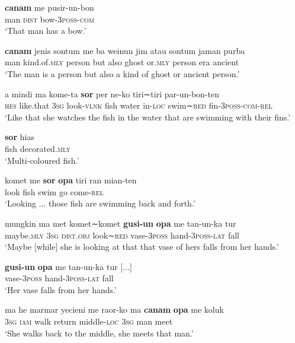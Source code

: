 \documentclass[output=paper,colorlinks,citecolor=brown]{langscibook}
\begin{document}
\ex\label{exe:fishnarr:m} \gll \textbf{canam} me pusir-un-bon\\
man \textsc{dist} bow-\textsc{3poss-com}\\
\glt`That man has a bow.'

\ex\label{exe:fishnarr:n} \gll \textbf{canam} jenis sontum me ba weinun jim atau sontum jaman purba\\
man kind.of.\textsc{mly} person {\glme} but also ghost or.\textsc{mly} person era ancient\\
\glt `The man is a person but also a kind of ghost or ancient person.'

\ex\label{exe:fishnarr:o}	\gll a mindi ma kome-ta \textbf{sor} per ne-ko tiri∼tiri par-un-bon-ten\\
\textsc{hes} like.that \textsc{3sg} look-\textsc{vlnk} fish water in-\textsc{loc} swim∼\textsc{red} fin-\textsc{3poss-com-rel}\\
\glt `Like that she watches the fish in the water that are swimming with their fins.'

\ex\label{exe:fishnarr:p} \gll \textbf{sor} hias\\
fish decorated.\textsc{mly}\\
\glt `Multi-coloured fish.'

\ex\label{exe:fishnarr:q} \gll komet me \textbf{sor} \textbf{opa} tiri ran mian-ten\\
look {\glme} fish {\glopa} swim go come-\textsc{rel}\\
\glt `Looking ... those fish are swimming back and forth.'

\ex\label{exe:fishnarr:r} \gll mungkin ma met komet∼komet \textbf{gusi-un} \textbf{opa} me tan-un-ka tur\\
maybe.\textsc{mly} \textsc{3sg} \textsc{dist.obj} look∼\textsc{red} vase-\textsc{3poss} {\glopa} {\glme} hand-\textsc{3poss-lat} fall\\
\glt `Maybe [while] she is looking at that that vase of hers falls from her hands.'

\ex\label{exe:fishnarr:s} \gll \textbf{gusi-un} \textbf{opa} me tan-un-ka tur [...] \\
vase-\textsc{3poss} {\glopa} {\glme} hand-\textsc{3poss-lat} fall {}\\
\glt `Her vase falls from her hands.'

\ex\label{exe:fishnarr:t} \gll ma he marmar yecieni me raor-ko ma \textbf{canam} \textbf{opa} me koluk\\
\textsc{3sg} \textsc{iam} walk return {\glme} middle-\textsc{loc} \textsc{3sg} man {\glopa} {\glme} meet\\
\glt `She walks back to the middle, she meets that man.'
\z \z
\end{document}
